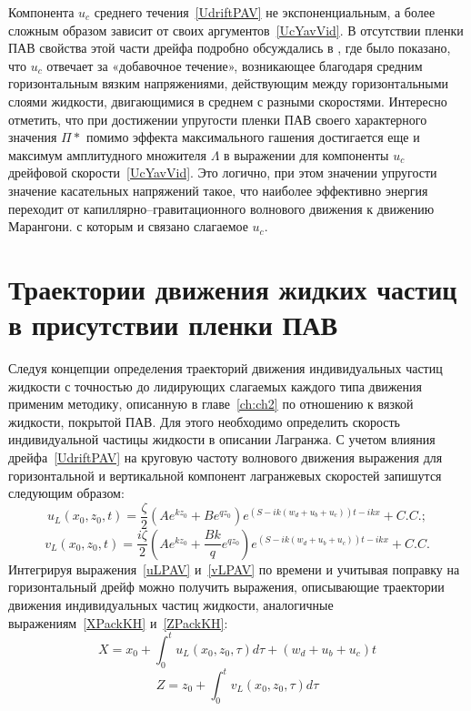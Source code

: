 Компонента $ u_{c} $ среднего течения~\eqref{UdriftPAV} не экспоненциальным, а более сложным образом зависит от своих аргументов~\eqref{UcYavVid}. В отсутствии пленки ПАВ свойства этой части дрейфа подробно обсуждались в \parencite{BelonozhkoZHTF}, где было показано, что $ u_{c} $ отвечает за «добавочное течение», возникающее благодаря средним горизонтальным вязким напряжениями, действующим между горизонтальными слоями жидкости, двигающимися в среднем с разными скоростями. Интересно отметить, что при достижении упругости пленки ПАВ своего характерного значения $ \Pi* $ помимо эффекта максимального гашения достигается еще и максимум амплитудного множителя $ \Lambda $ в выражении для компоненты $ u_{c} $ дрейфовой скорости~\eqref{UcYavVid}. Это логично, при этом значении упругости значение касательных напряжений такое, что наиболее эффективно энергия переходит от капиллярно--гравитационного волнового движения к движению Марангони. с которым и связано слагаемое $ u_{c} $. 


\section{Траектории движения жидких частиц в присутствии пленки ПАВ}

Следуя концепции определения траекторий движения индивидуальных частиц жидкости с точностью до лидирующих слагаемых каждого типа движения применим методику, описанную в главе~\ref{ch:ch2} по отношению к вязкой жидкости, покрытой ПАВ. Для этого необходимо определить скорость индивидуальной частицы жидкости в описании Лагранжа. С учетом влияния дрейфа~\eqref{UdriftPAV} на круговую частоту волнового движения выражения для горизонтальной и вертикальной компонент лагранжевых скоростей запишутся следующим образом:
\begin{equation}
u_{L} \left( x_{0}, z_{0}, t \right) =\dfrac{\zeta}{2}\left(A e^{k z_{0}} +B e^{q z_{0}} \right) e^{\left( S- i k \left( w_{d}+u_{b}+u_{c} \right) \right)  t - i k x }+C.C.;
\label{uLPAV}
\end{equation}
\begin{equation}
v_{L} \left( x_{0}, z_{0}, t \right)=\dfrac{i \zeta}{2}\left(A e^{k z_{0}} +\dfrac{B k}{q}e^{q z_{0}} \right) e^{ \left( S- i k \left( w_{d}+u_{b}+u_{c} \right) \right)  t - i k x }+C.C.
\label{vLPAV}
\end{equation}
 Интегрируя выражения~\eqref{uLPAV} и~\eqref{vLPAV} по времени и учитывая поправку на горизонтальный дрейф можно получить выражения, описывающие траектории движения индивидуальных частиц жидкости, аналогичные выражениям~\eqref{XPackKH} и~\eqref{ZPackKH}:
 \begin{equation}
X=x_{0}+\int_{0}^{t}u_{L}\left( x_{0}, z_{0}, \tau \right)d\tau + \left( w_{d}+u_{b}+u_{c} \right) t
\label{XPAV}
\end{equation}
\begin{equation}
Z=z_{0}+\int_{0}^{t}v_{L}\left( x_{0}, z_{0}, \tau \right)d\tau
\label{ZPAV}
\end{equation}	  

